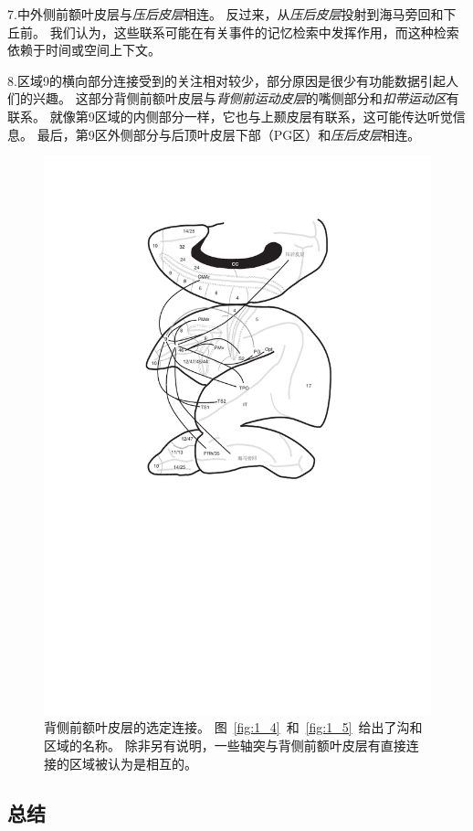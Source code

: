 7.中外侧前额叶皮层与\textit{压后皮层}相连\cite{morris1999fiber}。
反过来，从\textit{压后皮层}投射到海马旁回和下丘前\cite{kobayashi2007macaque}。
我们认为，这些联系可能在有关事件的记忆检索中发挥作用，而这种检索依赖于时间或空间上下文\cite{vann2009does}。
\par


8.区域9的横向部分连接受到的关注相对较少，部分原因是很少有功能数据引起人们的兴趣。
这部分背侧前额叶皮层与\textit{背侧前运动皮层}的嘴侧部分\cite{petrides1999dorsolateral}和\textit{扣带运动区}\cite{morecraft1993frontal}有联系。
就像第9区域的内侧部分一样，它也与上颞皮层有联系，这可能传达听觉信息\cite{petrides1984projections,saleem2008complementary}。
最后，第9区外侧部分与后顶叶皮层下部（PG区）\cite{cavada1989posterior}和\textit{压后皮层}\cite{kobayashi2003macaque}相连。


\begin{figure}
	\centering
	\includegraphics[width=0.7\linewidth]{chap6/6_2}
	\caption{背侧前额叶皮层的选定连接。
		图~\ref{fig:1_4}~和~\ref{fig:1_5}~给出了沟和区域的名称。
		除非另有说明，一些轴突与背侧前额叶皮层有直接连接的区域被认为是相互的。}
	\label{fig:6_2}
\end{figure}



\subsection{总结}


